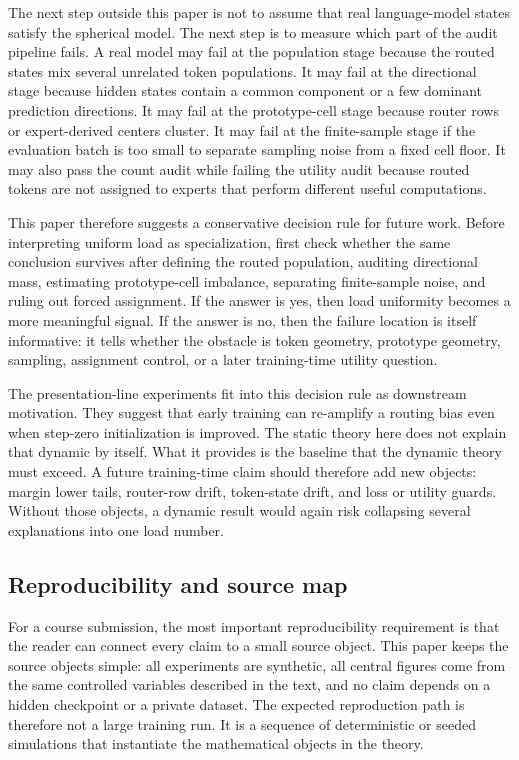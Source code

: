The next step outside this paper is not to assume that real language-model
states satisfy the spherical model. The next step is to measure which part of
the audit pipeline fails. A real model may fail at the population stage because
the routed states mix several unrelated token populations. It may fail at the
directional stage because hidden states contain a common component or a few
dominant prediction directions. It may fail at the prototype-cell stage because
router rows or expert-derived centers cluster. It may fail at the finite-sample
stage if the evaluation batch is too small to separate sampling noise from a
fixed cell floor. It may also pass the count audit while failing the utility
audit because routed tokens are not assigned to experts that perform different
useful computations.

This paper therefore suggests a conservative decision rule for future work.
Before interpreting uniform load as specialization, first check whether the
same conclusion survives after defining the routed population, auditing
directional mass, estimating prototype-cell imbalance, separating finite-sample
noise, and ruling out forced assignment. If the answer is yes, then load
uniformity becomes a more meaningful signal. If the answer is no, then the
failure location is itself informative: it tells whether the obstacle is token
geometry, prototype geometry, sampling, assignment control, or a later
training-time utility question.

The presentation-line experiments fit into this decision rule as downstream
motivation. They suggest that early training can re-amplify a routing bias even
when step-zero initialization is improved. The static theory here does not
explain that dynamic by itself. What it provides is the baseline that the
dynamic theory must exceed. A future training-time claim should therefore add
new objects: margin lower tails, router-row drift, token-state drift, and loss
or utility guards. Without those objects, a dynamic result would again risk
collapsing several explanations into one load number.

\subsection{Reproducibility and source map}

For a course submission, the most important reproducibility requirement is that
the reader can connect every claim to a small source object. This paper keeps
the source objects simple: all experiments are synthetic, all central figures
come from the same controlled variables described in the text, and no claim
depends on a hidden checkpoint or a private dataset. The expected reproduction
path is therefore not a large training run. It is a sequence of deterministic
or seeded simulations that instantiate the mathematical objects in the theory.

